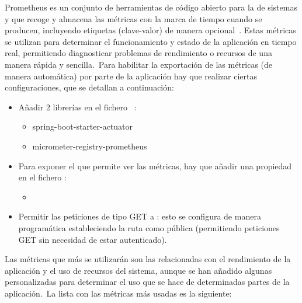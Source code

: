 Prometheus es un conjunto de herramientas de código abierto para la  de sistemas y
 que recoge y
almacena las métricas con la marca de tiempo cuando se producen, incluyendo etiquetas (clave-valor) de manera
opcional~\cite{prometheus-overview}.
Estas métricas se utilizan para determinar el funcionamiento y estado de la aplicación en tiempo real, permitiendo
diagnosticar problemas de rendimiento o recursos de una manera rápida y sencilla.\ Para habilitar la exportación de
las métricas (de manera automática) por parte de la aplicación hay que realizar ciertas configuraciones,
que se detallan a continuación:

\begin{itemize}
	\item Añadir 2 librerías en el fichero ~\cite{prometheus-metrics-pom}:
	\begin{itemize}
		\item spring-boot-starter-actuator
		\item micrometer-registry-prometheus
	\end{itemize}

	\item Para exponer el  que permite ver las métricas, hay que añadir una propiedad en el fichero
	:
	\begin{itemize}
		\item {}
	\end{itemize}

	\item Permitir las peticiones de tipo GET a : esto se configura
	de manera programática estableciendo la ruta como pública (permitiendo peticiones GET sin necesidad de estar
	autenticado).
\end{itemize}
\label{itm:metrics-export-config}

Las métricas que más se utilizarán son las relacionadas con el rendimiento de la aplicación y el uso de recursos del
sistema, aunque se han añadido algunas personalizadas para determinar el uso que se hace de determinadas partes de la
aplicación.\ La lista con las métricas más usadas es la siguiente:

